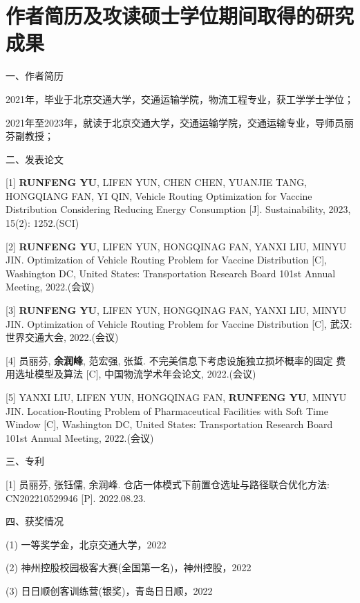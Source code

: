  \setlength{\baselineskip}{16pt}
\chapter{作者简历及攻读硕士学位期间取得的研究成果}
\setlength{\parindent}{0pt}


一、作者简历

2021年，毕业于北京交通大学，交通运输学院，物流工程专业，获工学学士学位；

2021年至2023年，就读于北京交通大学，交通运输学院，交通运输专业，导师员丽芬副教授；

\vspace{10pt}
二、发表论文

[1] \textbf{RUNFENG YU}, LIFEN YUN, CHEN CHEN, YUANJIE TANG, HONGQIANG FAN, YI QIN, Vehicle Routing Optimization for Vaccine Distribution Considering Reducing Energy Consumption [J]. Sustainability, 2023, 15(2): 1252.(SCI)

[2] \textbf{RUNFENG YU}, LIFEN YUN, HONGQINAG FAN, YANXI LIU, MINYU JIN. Optimization of Vehicle Routing Problem for Vaccine Distribution [C], Washington DC, United States: Transportation Research Board 101st Annual Meeting, 2022.(会议)

[3] \textbf{RUNFENG YU}, LIFEN YUN, HONGQINAG FAN, YANXI LIU, MINYU JIN. Optimization of Vehicle Routing Problem for Vaccine Distribution [C], 武汉: 世界交通大会, 2022.(会议) 


[4] 员丽芬, \textbf{余润峰}, 范宏强, 张蜇. 不完美信息下考虑设施独立损坏概率的固定 费用选址模型及算法 [C], 中国物流学术年会论文, 2022.(会议)

[5] YANXI LIU, LIFEN YUN, HONGQINAG FAN, \textbf{RUNFENG YU}, MINYU JIN. Location-Routing Problem of Pharmaceutical Facilities with Soft Time Window [C], Washington DC, United States: Transportation Research Board 101st Annual Meeting, 2022.(会议)

\vspace{10pt}
三、专利

[1] 员丽芬, 张钰儒, 余润峰. 仓店一体模式下前置仓选址与路径联合优化方法: CN202210529946 [P]. 2022.08.23.

%
%
%

\vspace{10pt}
四、获奖情况

(1) 一等奖学金，北京交通大学，2022

(2) 神州控股校园极客大赛(全国第一名)，神州控股，2022

(3) 日日顺创客训练营(银奖)，青岛日日顺，2022

